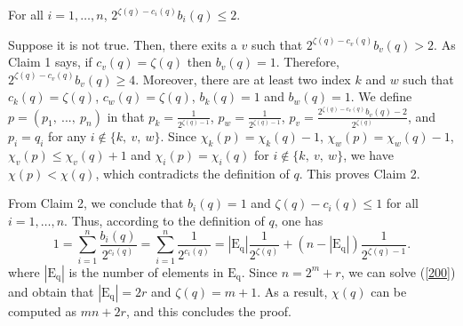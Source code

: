 \documentclass[a4paper, 11pt]{article}
\begin{document}
  For all $i=1,\dots,n$, $2^{\zeta(q)-c_i(q)}b_i(q)\leq 2$.

\medskip

Suppose it is not true. Then, there exits a $v$ such that $2^{\zeta(q)-c_{v}(q)}b_{v}(q)>2$. As Claim 1 says, if $c_{v}(q)=\zeta(q)$ then $b_{v}(q)=1$. Therefore, $2^{\zeta(q)-c_{v}(q)}b_{v}(q)\geq 4$. Moreover, there are at least two index $k$ and $w$ such that $c_{k}(q)=\zeta(q)$, $c_{w}(q)=\zeta(q)$, $b_{k}(q)=1$ and $b_{w}(q)=1$. We define $p=(p_1,\ ...,\ p_n)$ in that $p_k=\frac{1}{2^{\zeta(q)-1}}$, $p_{w}=\frac{1}{2^{\zeta(q)-1}}$,  $p_{v}=\frac{2^{\zeta(q)-c_{v}(q)}b_{v}(q)-2}{2^{\zeta(q)}}$, and $p_i=q_i$ for any $i\notin\{k,\ v,\ w\}$.  Since $\chi_{k}(p)=\chi_{k}(q)-1$, $\chi_{w}(p)=\chi_{w}(q)-1$, $\chi_{v}(p)\leq \chi_{v}(q)+1$ and $\chi_{i}(p)=\chi_{i}(q)$ for $i\notin\{ k,\ v,\ w\}$, we have $\chi(p) < \chi(q)$, which contradicts the definition of $q$. This proves Claim 2.

From Claim 2, we conclude that $b_i(q)=1$  and $\zeta(q)-c_i(q)\leq 1$ for all $i=1,\dots,n$. Thus, according to the definition of $q$, one has
\begin{equation}\label{200}
1=\sum_{i=1}^{n}\frac{b_i(q)}{2^{c_i(q)}}=\sum_{i=1}^{n}\frac{1}{2^{c_i(q)}}=|\mathrm{E_q}|\frac{1}{2^{\zeta(q)}}+(n-|\mathrm{E_q}|)\frac{1}{2^{\zeta(q)-1}}.
\end{equation}
where $|\mathrm{E_q}|$ is the number of elements in $\mathrm{E_q}$.
Since $n=2^m+r$, we can solve (\ref{200}) and obtain that $|\mathrm{E_q}|=2r$ and $\zeta(q)=m+1$. As a result, $\chi(q)$ can be computed as $mn+2r$, and this concludes the proof.
\end{document}
